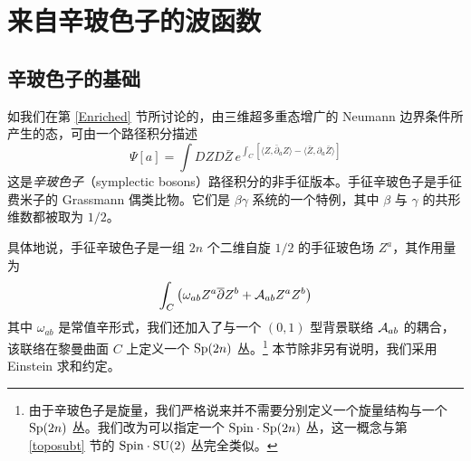 
\section{来自辛玻色子的波函数} \label{sec:symp}

\subsection{辛玻色子的基础}\label{sb}
如我们在第 \ref{Enriched} 节所讨论的，由三维超多重态增广的 Neumann 边界条件所产生的态，可由一个路径积分描述
\begin{equation}
\Psi[a] = \int DZ D\bar Z\, e^{\int_C \left[\langle Z, \bar \partial_a Z \rangle -  \langle 
\bar Z, \partial_a \bar Z \rangle\right]}
\end{equation} 
这是{\it 辛玻色子}（symplectic bosons）路径积分的非手征版本。手征辛玻色子是手征费米子的 Grassmann 偶类比物。它们是 $\beta \gamma$ 系统的一个特例，其中 $\beta$ 与 $\gamma$ 的共形维数都被取为 $1/2$。

具体地说，手征辛玻色子是一组 $2 n$ 个二维自旋 $1/2$ 的手征玻色场 $Z^a$，其作用量为 
\begin{equation}
\int_{C}\left( \omega_{ab} Z^a \bar\partial Z^b + {\cal A}_{ab} Z^a Z^b\right)
\end{equation}
其中 $\omega_{ab}$ 是常值辛形式，我们还加入了与一个 $(0,1)$ 型背景联络 ${\cal A}_{ab}$ 的耦合，该联络在黎曼曲面 $C$ 上定义一个 $\Sp(2n)$ 丛。\footnote{由于辛玻色子是旋量，我们严格说来并不需要分别定义一个旋量结构与一个 $\Sp(2n)$ 丛。我们改为可以指定一个 $\Spin\cdot \Sp(2n)$ 丛，这一概念与第 \ref{toposubt} 节的 $\Spin\cdot \SU(2)$ 丛完全类似。} 本节除非另有说明，我们采用 Einstein 求和约定。 
 
